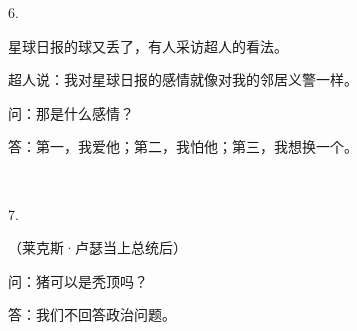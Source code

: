 6.

星球日报的球又丢了，有人采访超人的看法。

超人说：我对星球日报的感情就像对我的邻居义警一样。

问：那是什么感情？

答：第一，我爱他；第二，我怕他；第三，我想换一个。

~\

7.

（莱克斯·卢瑟当上总统后）

问：猪可以是秃顶吗？

答：我们不回答政治问题。